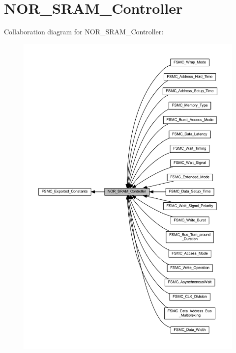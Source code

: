 \hypertarget{group___n_o_r___s_r_a_m___controller}{}\section{N\+O\+R\+\_\+\+S\+R\+A\+M\+\_\+\+Controller}
\label{group___n_o_r___s_r_a_m___controller}
Collaboration diagram for N\+O\+R\+\_\+\+S\+R\+A\+M\+\_\+\+Controller\+:
\nopagebreak
\begin{figure}[H]
\begin{center}
\leavevmode
\includegraphics[width=350pt]{group___n_o_r___s_r_a_m___controller}
\end{center}
\end{figure}
